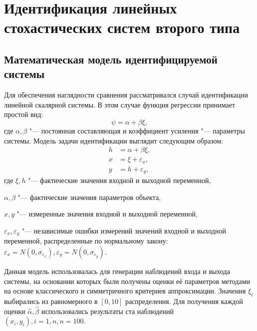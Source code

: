 \chapter[Идентификация линейных стохастических систем второго типа]{%
  Идентификация линейных стохастических систем второго типа
}

\section{Математическая модель идентифицируемой системы}

Для обеспечения наглядности сравнения рассматривался случай
идентификации линейной скалярной системы.
В этом случае функция регрессии принимает простой вид:
\begin{equation}
  \psi = \alpha + \beta \xi,
  \label{eq:fun_linear_scalar}
\end{equation}
где \( \alpha, \beta \) "--- постоянная составляющая и коэффициент усиления "---
параметры системы. Модель задачи идентификации выглядит следующим образом:
\begin{equation}
  \label{eq:model_linear_scalar}
  \begin{aligned}
  h &= \alpha + \beta \xi, \\
  x &= \xi + \varepsilon_x, \\
  y &= h + \varepsilon_y,
  \end{aligned}
\end{equation}
где \( \xi, h \) "--- фактические значения входной и выходной переменной, \par
\( \alpha, \beta \) "--- фактические значения параметров объекта, \par
\( x, y \) "--- измеренные значения входной и выходной переменной, \par
\( \varepsilon_x, \varepsilon_y \) "--- независимые ошибки измерений значений входной и
выходной переменной, распределенные по нормальному закону:
\(
\varepsilon_x = N(0, \sigma_{\varepsilon_x}),
\varepsilon_y = N(0, \sigma_{\varepsilon_y})
\).

Данная модель использовалась для генерации наблюдений входа и выхода системы,
на основании которых были получены оценки её параметров методами на основе
классического и симметричного критериев аппроксимации.
Значения \( \xi_i \) выбирались из равномерного в \( [0, 10] \) распределения.
Для получения каждой оценки \( \hat{\alpha}, \hat{\beta} \) использовались результаты
ста наблюдений \( ( x_i, y_i ), i = \overline{1, n}, n = 100 \).

